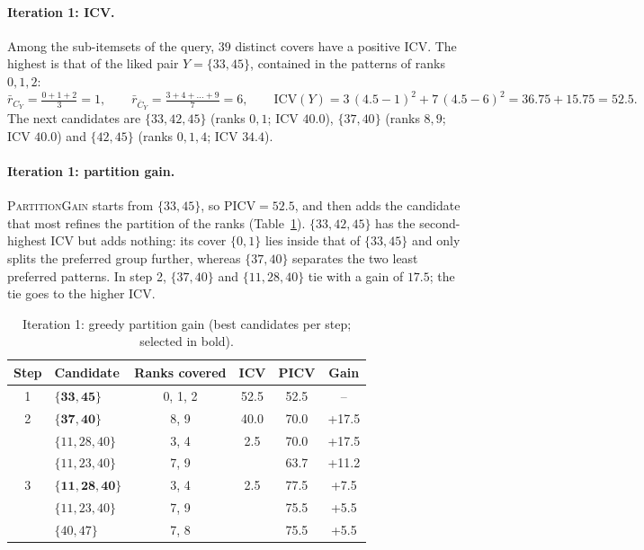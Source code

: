 \paragraph{Iteration 1: ICV.}
Among the sub-itemsets of the query, $39$ distinct covers have a positive ICV. The highest is that of the liked
pair $Y = \{33, 45\}$, contained in the patterns of ranks $0, 1, 2$:
\begin{equation*}
  \bar{r}_{C_Y} = \tfrac{0+1+2}{3} = 1, \qquad
  \bar{r}_{\overline{C}_Y} = \tfrac{3+4+\dots+9}{7} = 6, \qquad
  \mathrm{ICV}(Y) = 3\,(4.5 - 1)^2 + 7\,(4.5 - 6)^2 = 36.75 + 15.75 = 52.5 .
\end{equation*}
The next candidates are $\{33, 42, 45\}$ (ranks $0, 1$; ICV $40.0$), $\{37, 40\}$ (ranks $8, 9$; ICV $40.0$) and
$\{42, 45\}$ (ranks $0, 1, 4$; ICV $34.4$).

\paragraph{Iteration 1: partition gain.}
\textsc{PartitionGain} starts from $\{33, 45\}$, so $\mathrm{PICV} = 52.5$, and then adds the candidate that
most refines the partition of the ranks (Table~\ref{tab:ex_gain1}). $\{33, 42, 45\}$ has the second-highest ICV
but adds nothing: its cover $\{0, 1\}$ lies inside that of $\{33, 45\}$ and only splits the preferred group
further, whereas $\{37, 40\}$ separates the two least preferred patterns. In step 2, $\{37, 40\}$ and
$\{11, 28, 40\}$ tie with a gain of $17.5$; the tie goes to the higher ICV.

\begin{table}[t]
\centering
\caption{Iteration 1: greedy partition gain (best candidates per step; selected in bold).}
\label{tab:ex_gain1}
\small
\begin{tabular}{clcccc}
\toprule
Step & Candidate & Ranks covered & ICV & PICV & Gain \\
\midrule
1 & $\mathbf{\{33,45\}}$     & 0, 1, 2 & 52.5 & 52.5 & -- \\
\midrule
2 & $\mathbf{\{37,40\}}$     & 8, 9    & 40.0 & 70.0 & +17.5 \\
  & $\{11,28,40\}$           & 3, 4    & 2.5  & 70.0 & +17.5 \\
  & $\{11,23,40\}$           & 7, 9    &      & 63.7 & +11.2 \\
\midrule
3 & $\mathbf{\{11,28,40\}}$  & 3, 4    & 2.5  & 77.5 & +7.5 \\
  & $\{11,23,40\}$           & 7, 9    &      & 75.5 & +5.5 \\
  & $\{40,47\}$              & 7, 8    &      & 75.5 & +5.5 \\
\bottomrule
\end{tabular}
\end{table}

